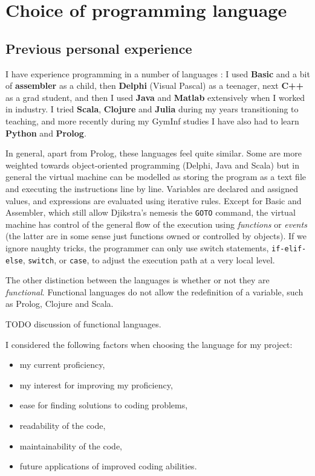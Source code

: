 \documentclass[10pt]{article}
\begin{document}
\section{Choice of programming language} \label{language}

\subsection{Previous personal experience}

I have experience programming in a number of languages : I used \textbf{Basic} and a bit of \textbf{assembler} as a child, then \textbf{Delphi} (Visual Pascal) as a teenager, next \textbf{C++} as a grad student, and then I used \textbf{Java} and \textbf{Matlab} extensively when I worked in industry. I tried \textbf{Scala}, \textbf{Clojure} and \textbf{Julia} during my years transitioning to teaching, and more recently during my GymInf studies I have also had to learn \textbf{Python} and \textbf{Prolog}.

In general, apart from Prolog, these languages feel quite similar. Some are more weighted towards object-oriented programming (Delphi, Java and Scala) but in general the virtual machine can be modelled as storing the program as a text file and executing the instructions line by line. Variables are declared and assigned values, and expressions are evaluated using iterative rules. Except for Basic and Assembler, which still allow Djikstra's nemesis the \texttt{GOTO} command, the virtual machine has control of the general flow of the execution using \emph{functions} or \emph{events} (the latter are in some sense just functions owned or controlled by objects). If we ignore naughty tricks, the programmer can only use switch statements, \texttt{if-elif-else}, \texttt{switch}, or \texttt{case}, to adjust the execution path at a very local level.

The other distinction between the languages is whether or not they are \emph{functional}. Functional languages do not allow the redefinition of a variable, such as Prolog, Clojure and Scala. 


TODO discussion of functional languages.

I considered the following factors when choosing the language for my project:
\begin{itemize}
\item my current proficiency,
\item my interest for improving my proficiency,
\item ease for finding solutions to coding problems,
\item readability of the code,
\item maintainability of the code,
\item future applications of improved coding abilities.
\end{itemize}
\end{document}
